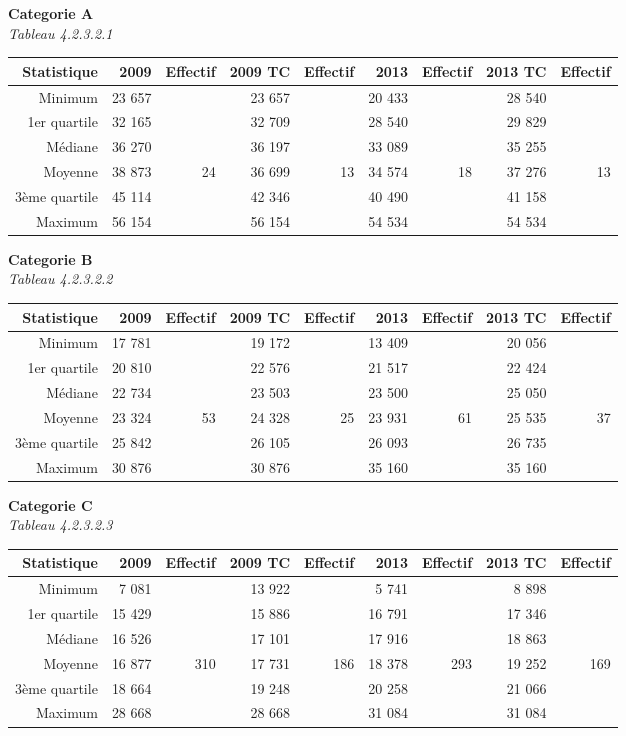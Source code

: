 \textbf{Categorie A}\\
\hspace*{0.333em}\emph{Tableau 4.2.3.2.1}

\begin{longtable}[]{@{}rrrrrrrrr@{}}
\toprule
Statistique & 2009 & Effectif & 2009 TC & Effectif & 2013 & Effectif &
2013 TC & Effectif\tabularnewline
\midrule
\endhead
Minimum & 23 657 & & 23 657 & & 20 433 & & 28 540 &\tabularnewline
1er quartile & 32 165 & & 32 709 & & 28 540 & & 29 829 &\tabularnewline
Médiane & 36 270 & & 36 197 & & 33 089 & & 35 255 &\tabularnewline
Moyenne & 38 873 & 24 & 36 699 & 13 & 34 574 & 18 & 37 276 &
13\tabularnewline
3ème quartile & 45 114 & & 42 346 & & 40 490 & & 41 158 &\tabularnewline
Maximum & 56 154 & & 56 154 & & 54 534 & & 54 534 &\tabularnewline
\bottomrule
\end{longtable}

\textbf{Categorie B}\\
\hspace*{0.333em}\emph{Tableau 4.2.3.2.2}

\begin{longtable}[]{@{}rrrrrrrrr@{}}
\toprule
Statistique & 2009 & Effectif & 2009 TC & Effectif & 2013 & Effectif &
2013 TC & Effectif\tabularnewline
\midrule
\endhead
Minimum & 17 781 & & 19 172 & & 13 409 & & 20 056 &\tabularnewline
1er quartile & 20 810 & & 22 576 & & 21 517 & & 22 424 &\tabularnewline
Médiane & 22 734 & & 23 503 & & 23 500 & & 25 050 &\tabularnewline
Moyenne & 23 324 & 53 & 24 328 & 25 & 23 931 & 61 & 25 535 &
37\tabularnewline
3ème quartile & 25 842 & & 26 105 & & 26 093 & & 26 735 &\tabularnewline
Maximum & 30 876 & & 30 876 & & 35 160 & & 35 160 &\tabularnewline
\bottomrule
\end{longtable}

\textbf{Categorie C}\\
\hspace*{0.333em}\emph{Tableau 4.2.3.2.3}

\begin{longtable}[]{@{}rrrrrrrrr@{}}
\toprule
Statistique & 2009 & Effectif & 2009 TC & Effectif & 2013 & Effectif &
2013 TC & Effectif\tabularnewline
\midrule
\endhead
Minimum & 7 081 & & 13 922 & & 5 741 & & 8 898 &\tabularnewline
1er quartile & 15 429 & & 15 886 & & 16 791 & & 17 346 &\tabularnewline
Médiane & 16 526 & & 17 101 & & 17 916 & & 18 863 &\tabularnewline
Moyenne & 16 877 & 310 & 17 731 & 186 & 18 378 & 293 & 19 252 &
169\tabularnewline
3ème quartile & 18 664 & & 19 248 & & 20 258 & & 21 066 &\tabularnewline
Maximum & 28 668 & & 28 668 & & 31 084 & & 31 084 &\tabularnewline
\bottomrule
\end{longtable}

